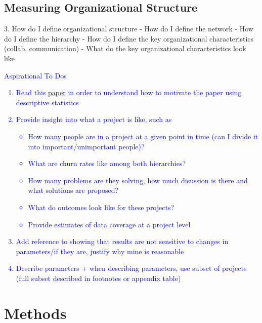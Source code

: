 \documentclass[12pt,notitlepage]{article}
\begin{document}
\subsection{Measuring Organizational Structure}
3. How do I define organizational structure
- How do I define the network
- How do I define the hierarchy
- How do I define the key organizational characteristics (collab, communication)
- What do the key organizational characteristics look like




\textcolor{blue}{Aspirational To Dos
\begin{enumerate}
    \item Read this  \href{https://pubs.aeaweb.org/doi/pdfplus/10.1257/jep.36.3.211}{paper} in order to understand how to motivate the paper using descriptive statistics
    \item Provide insight into what a project is like, such as
    \begin{itemize}
        \item How many people are in a project at a given point in time (can I divide it into important/unimportant people)?
        \item What are churn rates like among both hierarchies?
        \item How many problems are they solving, how much disussion is there and what solutions are proposed?
        \item What do outcomes look like for these projects?
        \item Provide estimates of data coverage at a project level 
    \end{itemize}
    \item Add reference to showing that results are not sensitive to changes in parameters/if they are, justify why mine is reasonable 
    \item Describe parameters + when describing parameters, use subset of projects (full subset described in footnotes or appendix table)
\end{enumerate}}



\section{Methods} \label{sec:method}
\end{document}
